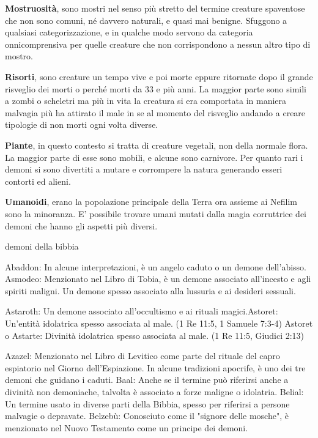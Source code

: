 \documentclass[a4paper,twoside,openany]{book}
\begin{document}
\smallskip\textbf{Mostruosità}, sono mostri nel senso più stretto del termine creature spaventose che non sono comuni, né davvero naturali, e quasi mai benigne.
Sfuggono a qualsiasi categorizzazione, e in qualche modo servono da categoria onnicomprensiva per quelle creature che non corrispondono a nessun altro tipo di mostro.

\smallskip\textbf{Risorti}, sono creature un tempo vive e poi morte eppure ritornate dopo il grande risveglio dei morti o perché morti da 33 e più anni. La maggior parte sono simili a zombi o scheletri ma più in vita la creatura si era comportata in maniera malvagia più ha attirato il male in se al momento del risveglio andando a creare tipologie di non morti ogni volta diverse.

\smallskip\textbf{Piante}, in questo contesto si tratta di creature vegetali, non della normale flora. La maggior parte di esse sono mobili, e alcune sono carnivore. Per quanto rari i demoni si sono divertiti a mutare e corrompere la natura generando esseri contorti ed alieni.

\smallskip\textbf{Umanoidi}, erano la popolazione principale della Terra ora assieme ai Nefilim sono la minoranza. E' possibile trovare umani mutati dalla magia corruttrice dei demoni che hanno gli aspetti più diversi.

\medskip

\pagebreak


demoni della bibbia

Abaddon: In alcune interpretazioni, è un angelo caduto o un demone dell'abisso.
Asmodeo: Menzionato nel Libro di Tobia, è un demone associato all'incesto e agli spiriti maligni. Un demone spesso associato alla lussuria e ai desideri sessuali.

Astaroth: Un demone associato all'occultismo e ai rituali magici.Astoret: Un'entità idolatrica spesso associata al male. (1 Re 11:5, 1 Samuele 7:3-4)
Astoret o Astarte: Divinità idolatrica spesso associata al male. (1 Re 11:5, Giudici 2:13)



Azazel: Menzionato nel Libro di Levitico come parte del rituale del capro espiatorio nel Giorno dell'Espiazione. In alcune tradizioni apocrife, è uno dei tre demoni che guidano i caduti.
Baal: Anche se il termine può riferirsi anche a divinità non demoniache, talvolta è associato a forze maligne o idolatria.
Belial: Un termine usato in diverse parti della Bibbia, spesso per riferirsi a persone malvagie o depravate.
Belzebù: Conosciuto come il "signore delle mosche", è menzionato nel Nuovo Testamento come un principe dei demoni.
\end{document}
